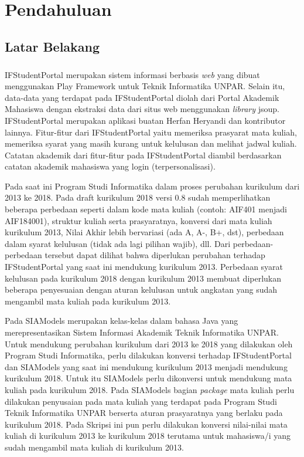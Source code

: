 \chapter{Pendahuluan}
\label{chap:intro}
   
\section{Latar Belakang}
\label{sec:label}

\paragraph{} IFStudentPortal\cite{ifstudentportal} merupakan sistem informasi berbasis  \textit{web} yang dibuat menggunakan Play Framework \cite{Leroux:2014} untuk Teknik Informatika UNPAR. Selain itu, data-data yang terdapat pada IFStudentPortal diolah dari Portal Akademik Mahasiswa dengan ekstraksi data dari situs web menggunakan \textit{library} jsoup. IFStudentPortal merupakan aplikasi buatan Herfan Heryandi dan kontributor lainnya. Fitur-fitur dari IFStudentPortal yaitu memeriksa prasyarat mata kuliah, memeriksa syarat yang masih kurang untuk kelulusan dan melihat jadwal kuliah. Catatan akademik dari fitur-fitur pada IFStudentPortal diambil berdasarkan catatan akademik mahasiswa yang login (terpersonalisasi).

Pada saat ini Program Studi Informatika dalam proses perubahan kurikulum dari 2013 ke 2018. Pada draft kurikulum 2018 versi 0.8 \cite{draftkurikulum2018} sudah memperlihatkan beberapa perbedaan seperti dalam kode mata kuliah (contoh: AIF401 menjadi AIF184001), struktur kuliah serta prasyaratnya, konversi dari mata kuliah kurikulum 2013, Nilai Akhir lebih bervariasi (ada A, A-, B+, dst), perbedaan dalam syarat kelulusan (tidak ada lagi pilihan wajib), dll. Dari perbedaan-perbedaan tersebut dapat dilihat bahwa diperlukan perubahan terhadap IFStudentPortal yang saat ini mendukung kurikulum 2013. Perbedaan syarat kelulusan pada kurikulum 2018 dengan kurikulum 2013 membuat diperlukan beberapa penyesuaian dengan aturan kelulusan untuk angkatan yang sudah mengambil mata kuliah pada kurikulum 2013.

Pada SIAModels\cite{siamodels} merupakan kelas-kelas dalam bahasa Java yang merepresentasikan Sistem Informasi Akademik Teknik Informatika UNPAR. Untuk mendukung perubahan kurikulum dari 2013 ke 2018 yang dilakukan oleh Program Studi Informatika, perlu dilakukan konversi terhadap IFStudentPortal dan SIAModels yang saat ini mendukung kurikulum 2013 menjadi mendukung kurikulum 2018.  Untuk itu SIAModels perlu dikonversi untuk mendukung mata kuliah pada kurikulum 2018. Pada SIAModels bagian \textit{package} mata kuliah perlu dilakukan penyusaian pada mata kuliah yang terdapat pada Program Studi Teknik Informatika UNPAR berserta aturan prasyaratnya yang berlaku pada kurikulum 2018. Pada Skripsi ini pun perlu dilakukan konversi nilai-nilai mata kuliah di kurikulum 2013 ke kurikulum 2018 terutama untuk mahasiswa/i yang sudah mengambil mata kuliah di kurikulum 2013.

